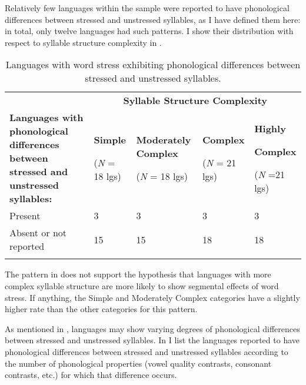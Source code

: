   Relatively few languages within the sample were reported to have phonological differences between stressed and unstressed syllables, as I have defined them here: in total, only twelve languages had such patterns. I show their distribution with respect to syllable structure complexity in .

\begin{table}
\begin{tabularx}{\textwidth}{XXXXX}
\lsptoprule
 & \multicolumn{4}{c}{ \textbf{Syllable Structure Complexity}}\\
 \textbf{Languages with phonological differences between stressed and unstressed syllables:} & { \textbf{Simple}}

 (\textit{N} = 18 lgs) & { \textbf{Moderately Complex}}

 (\textit{N} = 18 lgs) & { \textbf{Complex}}

 (\textit{N} = 21 lgs) & { \textbf{Highly} }

{ \textbf{Complex}}

 (\textit{N} =21 lgs)\\
 Present & 3 & 3 & 3 & 3\\
 Absent or not reported & 15 & 15 & 18 & 18\\
\lspbottomrule
\end{tabularx}
\caption{\label{tab:5.10}Languages with word stress exhibiting phonological differences between stressed and unstressed syllables.}
\end{table}

  The pattern in  does not support the hypothesis that languages with more complex syllable structure are more likely to show segmental effects of word stress. If anything, the Simple and Moderately Complex categories have a slightly higher rate than the other categories for this pattern.

  As mentioned in , languages may show varying degrees of phonological differences between stressed and unstressed syllables. In  I list the languages reported to have phonological differences between stressed and unstressed syllables according to the number of phonological properties (vowel quality contrasts, consonant contrasts, etc.) for which that difference occurs.

